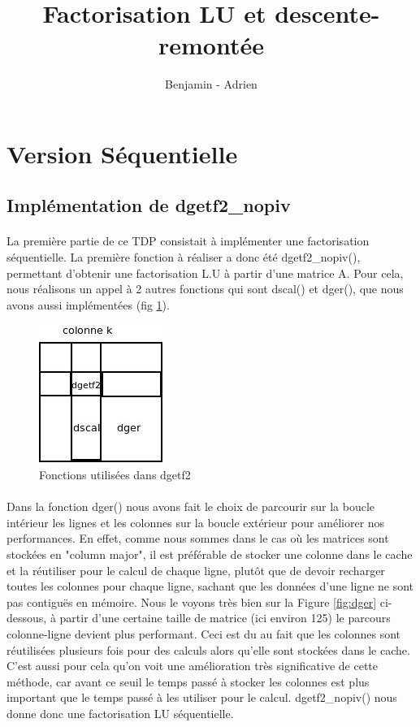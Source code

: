 \documentclass{article}
\title{Factorisation LU et descente-remontée}
\author{Benjamin \bsc{Angelaud} - Adrien \bsc{Guilbaud}}
\begin{document}
\maketitle

\section{Version Séquentielle}
\subsection{Implémentation de dgetf2\_nopiv}
\paragraph{}La première partie de ce TDP consistait à implémenter une factorisation séquentielle. La première fonction à réaliser a donc été dgetf2\_nopiv(), permettant d'obtenir une factorisation L.U à partir d'une matrice A.  Pour cela, nous réalisons un appel à 2 autres fonctions qui sont dscal() et dger(), que nous avons aussi implémentées (fig \ref{diag:dgetf2}).

\begin{figure}[ht]
  \centering
  \includegraphics[scale=0.5]{pictures/Diagramme_dgetf2.jpeg}
  \caption{\label{diag:dgetf2} Fonctions utilisées dans dgetf2}
\end{figure}

\paragraph{}Dans la fonction dger() nous avons fait le choix de parcourir sur la boucle intérieur les lignes et les colonnes sur la boucle extérieur pour améliorer nos performances. En effet, comme nous sommes dans le cas où les matrices sont stockées en "column major", il est préférable de stocker une colonne dans le cache et la réutiliser pour le calcul de chaque ligne, plutôt que de devoir recharger toutes les colonnes pour chaque ligne, sachant que les données d'une ligne ne sont pas contiguës en mémoire. Nous le voyons très bien sur la Figure \ref{fig:dger} ci-dessous, à partir d'une certaine taille de matrice (ici environ 125) le parcours colonne-ligne devient plus performant. Ceci est du au fait que les colonnes sont réutilisées plusieurs fois pour des calculs alors qu'elle sont stockées dans le cache. C'est aussi pour cela qu'on voit une amélioration très significative de cette méthode, car avant ce seuil le temps passé à stocker les colonnes est plus important que le temps passé à les utiliser pour le calcul.  dgetf2\_nopiv() nous donne donc une factorisation LU séquentielle.
\end{document}
